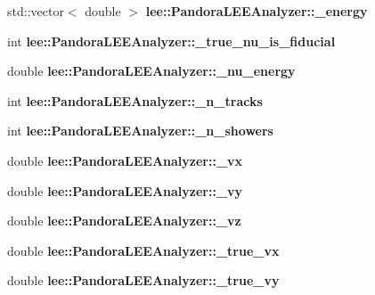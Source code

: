\begin{DoxyCompactItemize}
\item 
\hypertarget{group__lee_gaf64e85c1a6351ba43d787ae01d82f34e}{std\-::vector$<$ double $>$ {\bfseries lee\-::\-Pandora\-L\-E\-E\-Analyzer\-::\-\_\-energy}}\label{group__lee_gaf64e85c1a6351ba43d787ae01d82f34e}

\item 
\hypertarget{group__lee_ga0fb26f882cca04dd6e9d6162808365c8}{int {\bfseries lee\-::\-Pandora\-L\-E\-E\-Analyzer\-::\-\_\-true\-\_\-nu\-\_\-is\-\_\-fiducial}}\label{group__lee_ga0fb26f882cca04dd6e9d6162808365c8}

\item 
\hypertarget{group__lee_ga23ee0dccbe8495fa418cb6c0020c1643}{double {\bfseries lee\-::\-Pandora\-L\-E\-E\-Analyzer\-::\-\_\-nu\-\_\-energy}}\label{group__lee_ga23ee0dccbe8495fa418cb6c0020c1643}

\item 
\hypertarget{group__lee_ga023bb8e8a12ac261583b6d71fd1c12e2}{int {\bfseries lee\-::\-Pandora\-L\-E\-E\-Analyzer\-::\-\_\-n\-\_\-tracks}}\label{group__lee_ga023bb8e8a12ac261583b6d71fd1c12e2}

\item 
\hypertarget{group__lee_ga18da3a91fd8778add6fbd0c4e2244f89}{int {\bfseries lee\-::\-Pandora\-L\-E\-E\-Analyzer\-::\-\_\-n\-\_\-showers}}\label{group__lee_ga18da3a91fd8778add6fbd0c4e2244f89}

\item 
\hypertarget{group__lee_ga440e3b5b58670672f25f42dd09d0aa21}{double {\bfseries lee\-::\-Pandora\-L\-E\-E\-Analyzer\-::\-\_\-vx}}\label{group__lee_ga440e3b5b58670672f25f42dd09d0aa21}

\item 
\hypertarget{group__lee_gabbf5b67c1538e2771ba997ddd41c9341}{double {\bfseries lee\-::\-Pandora\-L\-E\-E\-Analyzer\-::\-\_\-vy}}\label{group__lee_gabbf5b67c1538e2771ba997ddd41c9341}

\item 
\hypertarget{group__lee_ga640cb654c98033c9294cb1fda9f86b89}{double {\bfseries lee\-::\-Pandora\-L\-E\-E\-Analyzer\-::\-\_\-vz}}\label{group__lee_ga640cb654c98033c9294cb1fda9f86b89}

\item 
\hypertarget{group__lee_ga537783c86380bbaf3357e3633f07ed7f}{double {\bfseries lee\-::\-Pandora\-L\-E\-E\-Analyzer\-::\-\_\-true\-\_\-vx}}\label{group__lee_ga537783c86380bbaf3357e3633f07ed7f}

\item 
\hypertarget{group__lee_gac8bd6c7a1c52045790f54232855c1073}{double {\bfseries lee\-::\-Pandora\-L\-E\-E\-Analyzer\-::\-\_\-true\-\_\-vy}}\label{group__lee_gac8bd6c7a1c52045790f54232855c1073}


\end{DoxyCompactItemize}
